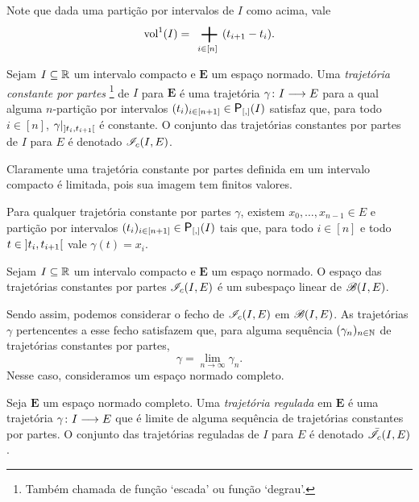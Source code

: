 Note que dada uma partição por intervalos de $I$ como acima, vale
	\begin{equation*}
	\vol^1(I) = \sum_{i \in [n]} (t_{i+1}-t_i).
	\end{equation*}

\begin{definition}
Sejam $I \subseteq \mathbb{R}$ um intervalo compacto e $\bm E$ um espaço normado. Uma \emph{trajetória constante por partes}%
	\footnote{Também chamada de função `escada' ou função `degrau'.}
de $I$ para $\bm E$ é uma trajetória $\gamma\colon \allowbreak I \longrightarrow E$ para a qual alguma $n$-partição por intervalos $(t_i)_{i \in [n+1]} \in \Partinter(I)$ satisfaz que, para todo $i \in [n]$, $\gamma|_{\left]t_i,\allowbreak t_{i+1}\right[}$ é constante.
O conjunto das trajetórias constantes por partes de $I$ para $E$ é denotado $\mathscr{I}_{c}(I,E)$.
\end{definition}

Claramente uma trajetória constante por partes definida em um intervalo compacto é limitada, pois sua imagem tem finitos valores.

Para qualquer trajetória constante por partes $\gamma$, existem $x_0, \ldots, x_{n-1} \in E$ e partição por intervalos $(t_i)_{i \in [n+1]} \in \Partinter(I)$ tais que, para todo $i \in [n]$ e todo $t \in \left]t_i,\allowbreak t_{i+1}\right[$ vale $\gamma(t) = x_i$.

\begin{exercise}
Sejam $I \subseteq \mathbb{R}$ um intervalo compacto e $\bm E$ um espaço normado. O espaço das trajetórias constantes por partes $\mathscr{I}_{c}(I,E)$ é um subespaço linear de $\mathscr{B}(I,E)$.
\end{exercise}

Sendo assim, podemos considerar o fecho de $\mathscr{I}_{c}(I,E)$ em $\mathscr{B}(I,E)$. As trajetórias $\gamma$ pertencentes a esse fecho satisfazem que, para alguma sequência $(\gamma_n)_{n \in \mathbb{N}}$ de trajetórias constantes por partes,
	\begin{equation*}
	\gamma = \lim_{n \to \infty} \gamma_n.
	\end{equation*}
Nesse caso, consideramos um espaço normado completo.

\begin{definition}
Seja $\bm E$ um espaço normado completo. Uma \emph{trajetória regulada} em $\bm E$ é uma trajetória $\gamma\colon \allowbreak I \longrightarrow E$ que é limite de alguma sequência de trajetórias constantes por partes. O conjunto das trajetórias reguladas de $I$ para $E$ é denotado $\bar{\mathscr{I}}_{c}(I,E)$.
\end{definition}

